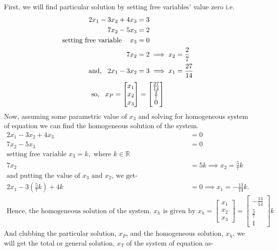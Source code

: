 \documentclass{article}
\begin{document}
First, we will find particular solution by setting free variables' value zero i.e.
\[
\begin{split}
  2x_1 - 3x_2 + 4x_3 &= 3 \\
  7x_2 - 5x_3 &= 2 \\
  \text{setting free variable\hspace{3mm}  } x_3 &= 0\\
  7x_2 &= 2 \implies x_2 = \frac{2}{7}\\
  \text{and,\hspace{3mm}} 2x_1 - 3x_2 &= 3 \implies x_1 = \frac{27}{14}\\ 
\end{split}
\]
\[
\text{so,\hspace{3mm}}x_P =
        \begin{bmatrix}
            x_1\\x_2\\x_3\\
        \end{bmatrix} = \begin{bmatrix}
                            \frac{27}{14}\\
                            \frac{2}{7}\\
                            0\\
                          \end{bmatrix}
\]
Now, assuming some parametric value of $x_3$ and solving for homogeneous system of equation we can find the homogeneous solution of the system.
\[
\begin{split}
  2x_1 - 3x_2 + 4x_3 &= 0 \\
  7x_2 - 5x_3 &= 0 \\
  \text{setting free variable } x_3 = k, \text{ where } k \in \mathbb{R} \\
  7x_2 &= 5k\implies x_2 = \frac{5}{7}k\\
  \text{and putting the value of }x_3 \text{ and } x_2\text{, we get-}\\
  2x_1 - 3(\frac{5}{7}k) +4k&= 0 \implies x_1 = -\frac{13}{14}k. \\
  \text{Hence, the homogeneous solution of the system, }x_h\text{ is given by }
  x_h = \begin{bmatrix}
      x_1\\x_2\\x_3
  \end{bmatrix}=\begin{bmatrix}
      -\frac{13}{14}\\\frac{5}{7}\\1
  \end{bmatrix}k
\end{split}
\] 
And clubbing the particular solution, $x_P$, and the homogeneous solution, $x_h$, we will get the total or general solution, $x_T$ of the system of equation as-
  
\end{document}
